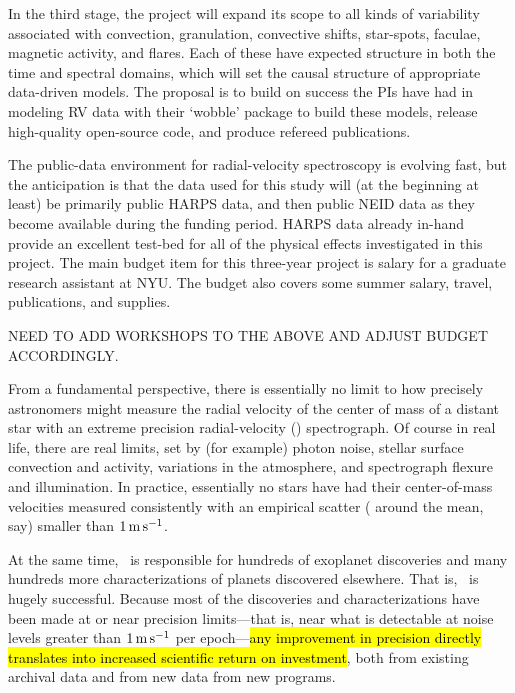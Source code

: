 \documentclass[12pt, letterpaper]{article}
\begin{document}
In the third stage, the project will expand its scope to all kinds of
variability associated with convection, granulation, convective
shifts, star-spots, faculae, magnetic activity, and flares. Each of
these have expected structure in both the time and spectral domains,
which will set the causal structure of appropriate data-driven
models. The proposal is to build on success the PIs have had in
modeling RV data with their ‘wobble’ package to build these models,
release high-quality open-source code, and produce refereed
publications.

The public-data environment for radial-velocity spectroscopy is
evolving fast, but the anticipation is that the data used for this
study will (at the beginning at least) be primarily public HARPS data,
and then public NEID data as they become available during the funding
period. HARPS data already in-hand provide an excellent test-bed for
all of the physical effects investigated in this project. The main
budget item for this three-year project is salary for a graduate
research assistant at NYU. The budget also covers some summer salary,
travel, publications, and supplies.

NEED TO ADD WORKSHOPS TO THE ABOVE AND ADJUST BUDGET ACCORDINGLY.


\noindent
From a fundamental perspective, there is essentially no limit to how
precisely astronomers might measure the radial velocity of the center of mass
of a distant star with an extreme precision radial-velocity (\EPRV) spectrograph.
Of course in real life, there are real limits, set
by (for example) photon noise, stellar surface convection and activity,
variations in the atmosphere, and spectrograph flexure and illumination. In practice,
essentially no stars have had their center-of-mass velocities measured
consistently with an empirical scatter ( around the mean,
say) smaller than $1\,{\mathrm{m\,s^{-1}}}$.

At the same time, \EPRV\ is responsible for hundreds of 
exoplanet discoveries and many hundreds more 
characterizations of planets
discovered elsewhere. That is, \EPRV\ is hugely successful.
Because most of the discoveries and characterizations have been made
at or near precision limits---that is, near what is detectable at noise levels
greater than $1\,{\mathrm{m\,s^{-1}}}$ per epoch---\hl{any improvement in precision directly
translates into increased scientific return on investment},
both from existing archival data and from new data from new programs.
\end{document}
